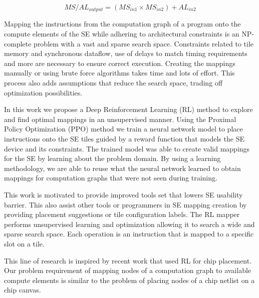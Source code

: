 \begin{equation}
    \label{eq:msal}
    MS/AL_{output} = (MS_{in1} \times MS_{in2}) + AL_{in2} 
\end{equation}


Mapping the instructions from the computation graph of a program onto the compute elements of the SE while adhering to architectural constraints is an NP-complete problem with a vast and sparse search space. 
Constraints related to tile memory and synchronous dataflow, use of delays to match timing requirements and more are necessary to ensure correct execution. 
Creating the mappings manually or using brute force algorithms takes time and lots of effort. 
This process also adds assumptions that reduce the search space, trading off optimization possibilities.  

In this work we propose a Deep Reinforcement Learning (RL) method to explore and find optimal mappings in an unsupervised manner. 
Using the Proximal Policy Optimization (PPO) method we train a neural network model to place instructions onto the SE tiles guided by a reward function that models the SE device and its constraints. 
The trained model was able to create valid mappings for the SE by learning about the problem domain. 
By using a learning methodology, we are able to reuse what the neural network learned to obtain mappings for computation graphs that were not seen during training.  

This work is motivated to provide improved tools set that lowers SE usability barrier.
This also assist other tools or programmers in SE mapping creation by providing placement suggestions or tile configuration labels.
The RL mapper performs unsupervised learning and optimization allowing it to search a wide and sparse search space. 
Each operation is an instruction that is mapped to a specific slot on a tile.

This line of research is inspired by recent work that used RL for chip placement.
Our problem requirement of mapping nodes of a computation graph to available compute elements is similar to the problem of placing nodes of a chip netlist on a chip canvas. 

